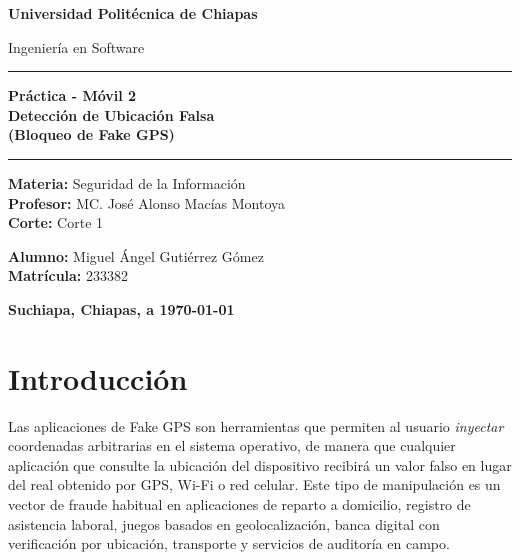 \documentclass[12pt, a4paper]{article}
\newcommand{\nombreuniversidad}{Universidad Politécnica de Chiapas}
\newcommand{\nombrecarrera}{Ingeniería en Software}
\newcommand{\nombremateria}{Seguridad de la Información}
\newcommand{\nombreprofesor}{MC. José Alonso Macías Montoya}
\newcommand{\corte}{Corte 1}
\newcommand{\actividad}{Práctica - Móvil 2 \\ Detección de Ubicación Falsa \\ (Bloqueo de Fake GPS)}
\newcommand{\nombres}{Miguel Ángel Gutiérrez Gómez}
\newcommand{\matricula}{233382}
\newcommand{\fechaentrega}{\today}
\newcommand{\ciudad}{Suchiapa, Chiapas}
\begin{document}
\begin{titlepage}
    \centering
    \vspace*{1cm}
    {\Huge\bfseries \nombreuniversidad \par}
    \vspace{0.5cm}
    {\Large \nombrecarrera \par}

    \vspace{2cm}
    \rule{\textwidth}{1.5pt}
    \vspace{0.4cm}
    {\Large\bfseries \actividad \par}
    \vspace{0.4cm}
    \rule{\textwidth}{1.5pt}

    \vspace{3cm}

    \begin{flushleft}
        \centering
        \textbf{Materia:} \nombremateria \\
        \textbf{Profesor:} \nombreprofesor \\
        \textbf{Corte:} \corte
    \end{flushleft}

    \vspace{0.5cm}

    \begin{flushleft}
        \centering
        \textbf{Alumno:} \nombres \\
        \textbf{Matrícula:} \matricula \\
    \end{flushleft}

    \vfill

    \vspace{1cm}
    \textbf{\ciudad, a \fechaentrega}

\end{titlepage}

\clearpage

\tableofcontents
\clearpage


\section{Introducción}
\label{sec:introduccion}
Las aplicaciones de Fake GPS son herramientas que permiten al usuario
\textit{inyectar} coordenadas arbitrarias en el sistema operativo, de
manera que cualquier aplicación que consulte la ubicación del dispositivo
recibirá un valor falso en lugar del real obtenido por GPS, Wi-Fi o red
celular. Este tipo de manipulación es un vector de fraude habitual en
aplicaciones de reparto a domicilio, registro de asistencia laboral,
juegos basados en geolocalización, banca digital con verificación por
ubicación, transporte y servicios de auditoría en campo.
\end{document}
